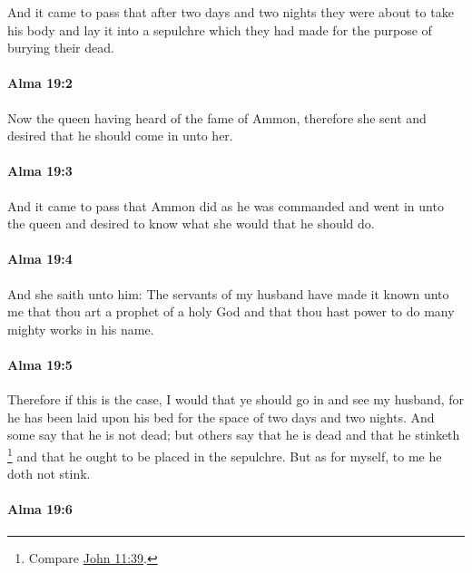 			And it came to pass that after two days and two nights
			they were about to take his body and lay it into a sepulchre
			which they had made for the purpose of burying their dead.

		\paragraph{Alma 19:2} %
			\label{ALMA-19-2}

			Now the queen having heard of the fame of Ammon,
			therefore she sent and desired that he should come in unto her.

		\paragraph{Alma 19:3} %
			\label{ALMA-19-3}

			And it came to pass that Ammon did as he was commanded
			and went in unto the queen and desired to know
			what she would that he should do.

		\paragraph{Alma 19:4} %
			\label{ALMA-19-4}

			And she saith unto him:
			The servants of my husband have made it known unto me
			that thou art a prophet of a holy God
			and that thou hast power to do many mighty works in his name.

		\paragraph{Alma 19:5} %
			\label{ALMA-19-5}

			Therefore if this is the case,
			I would that ye should go in and see my husband,
			for he has been laid upon his bed for the space of two days and two nights.
			And some say that he is not dead;
			but others say that he is dead and that he stinketh%
				\footnote{%
					Compare \hyperref[JOHN-11-39]{John 11:39}.
					}
			and that he ought to be placed in the sepulchre.
			But as for myself, to me he doth not stink.

		\paragraph{Alma 19:6} %
			\label{ALMA-19-6}

